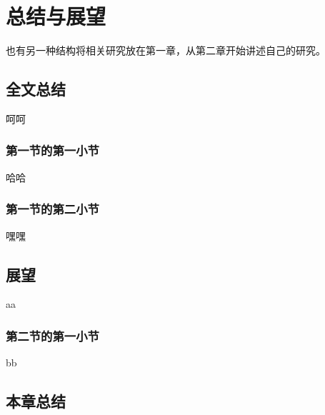
\chapter{总结与展望}

也有另一种结构将相关研究放在第一章，从第二章开始讲述自己的研究。

\section{全文总结}

呵呵

\subsection{第一节的第一小节}

哈哈

\subsection{第一节的第二小节}

嘿嘿

\section{展望}

aa

\subsection{第二节的第一小节}

bb

\section{本章总结}

\ifprint
	\newpage
	\thispagestyle{empty}
	\mbox{}
	
	\clearpage
	\setcounter{page}{10}
\fi